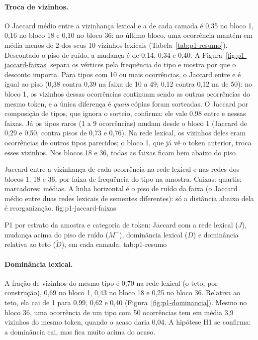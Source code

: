 \paragraph{Troca de vizinhos.} O Jaccard médio entre a vizinhança lexical e a de cada camada é
0,35 no bloco 1, 0,16 no bloco 18 e 0,10 no bloco 36: no último bloco, uma ocorrência mantém
em média menos de 2 dos seus 10 vizinhos lexicais (Tabela~\ref{tab:p1-resumo}). Descontado o
piso de ruído, a mudança é de 0,14, 0,34 e 0,40. A Figura~\ref{fig:p1-jaccard-faixas} separa os
vértices pela frequência do tipo e mostra por que o desconto importa. Para tipos com 10 ou mais
ocorrências, o Jaccard entre  e  é igual ao piso (0,38 contra 0,39 na faixa
de 10 a 49; 0,12 contra 0,12 na de 50): no bloco 1, os vizinhos dessas ocorrências continuam
sendo as outras ocorrências do mesmo token, e a única diferença é \emph{quais} cópias foram
sorteadas. O Jaccard por composição de tipos, que ignora o sorteio, confirma: ele vale 0,98
entre  e  nessas faixas. Já os tipos raros (1 a 9 ocorrências) mudam desde o
bloco 1 (Jaccard de 0,29 e 0,50, contra pisos de 0,73 e 0,76). Na rede lexical, os vizinhos
deles eram ocorrências de outros tipos parecidos; o bloco 1, que já vê o token anterior, troca
esses vizinhos. Nos blocos 18 e 36, todas as faixas ficam bem abaixo do piso.

    {Jaccard entre a vizinhança de cada ocorrência na rede lexical e nas redes dos blocos 1, 18
    e 36, por faixa de frequência do tipo na amostra. Caixas: quartis; marcadores: médias. A
    linha horizontal é o piso de ruído da faixa (o Jaccard médio entre duas redes lexicais de
    sementes diferentes): só a distância abaixo dela é reorganização.}
    {fig:p1-jaccard-faixas}

    {P1 por estrato da amostra e categoria de token: Jaccard com a rede lexical ($J$), mudança
    acima do piso de ruído ($M^{+}$), dominância lexical ($D$) e dominância relativa ao teto
    ($\tilde D$), em cada camada.}
    {tab:p1-resumo}

\paragraph{Dominância lexical.} A fração de vizinhos do mesmo tipo é 0,70 na rede lexical (o
teto, por construção), 0,69 no bloco 1, 0,43 no bloco 18 e 0,25 no bloco 36. Relativa ao teto,
ela cai de 1 para 0,99, 0,62 e 0,40 (Figura~\ref{fig:p1-dominancia}). Mesmo no bloco 36, uma
ocorrência de um tipo com 50 ocorrências tem em média 3,9 vizinhos do mesmo token, quando o
acaso daria 0,04. A hipótese H1 se confirma: a dominância cai, mas fica muito acima do acaso.

